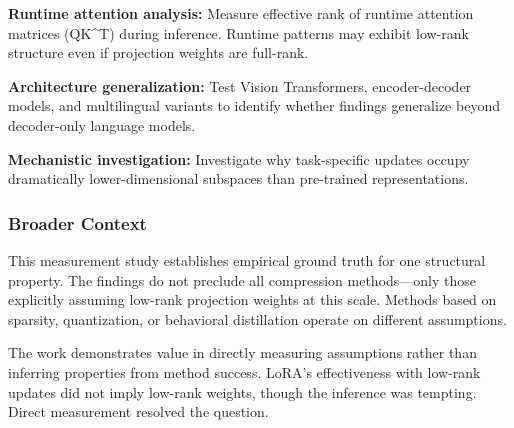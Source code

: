 \textbf{Runtime attention analysis:} Measure effective rank of runtime attention matrices (QK^T) during inference. Runtime patterns may exhibit low-rank structure even if projection weights are full-rank.

\textbf{Architecture generalization:} Test Vision Transformers, encoder-decoder models, and multilingual variants to identify whether findings generalize beyond decoder-only language models.

\textbf{Mechanistic investigation:} Investigate why task-specific updates occupy dramatically lower-dimensional subspaces than pre-trained representations.

\subsubsection{Broader Context}

This measurement study establishes empirical ground truth for one structural property. The findings do not preclude all compression methods---only those explicitly assuming low-rank projection weights at this scale. Methods based on sparsity, quantization, or behavioral distillation operate on different assumptions.

The work demonstrates value in directly measuring assumptions rather than inferring properties from method success. LoRA's effectiveness with low-rank updates did not imply low-rank weights, though the inference was tempting. Direct measurement resolved the question.
